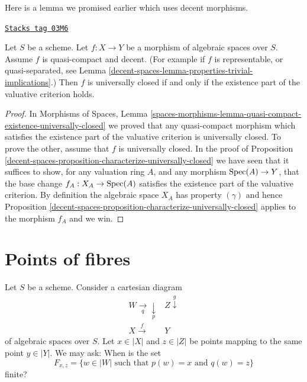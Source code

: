 Here is a lemma we promised earlier which uses decent morphisms.

\begin{lemma}
\label{decent-spaces-lemma-re-characterize-universally-closed}
\href{https://stacks.math.columbia.edu/tag/03M6}{\texttt{Stacks tag 03M6}}

Let $S$ be a scheme.
Let $f : X \to Y$ be a morphism of algebraic spaces over $S$.
Assume $f$ is quasi-compact and decent.
(For example if $f$ is representable, or quasi-separated, see
Lemma \ref{decent-spaces-lemma-properties-trivial-implications}.)
Then $f$ is universally closed if and only if the
existence part of the valuative criterion holds.
\end{lemma}

\begin{proof}
In
Morphisms of Spaces,
Lemma \ref{spaces-morphisms-lemma-quasi-compact-existence-universally-closed}
we proved that any quasi-compact morphism which satisfies the existence
part of the valuative criterion is universally closed.
To prove the other, assume that $f$ is universally closed.
In the proof of
Proposition \ref{decent-spaces-proposition-characterize-universally-closed}
we have seen that it suffices to show, for any valuation ring $A$,
and any morphism $\operatorname{Spec}(A) \to Y$, that the base change
$f_A : X_A \to \operatorname{Spec}(A)$ satisfies the existence part of the valuative
criterion. By definition the algebraic space $X_A$ has property $(\gamma)$
and hence
Proposition \ref{decent-spaces-proposition-characterize-universally-closed}
applies to the morphism $f_A$ and we win.
\end{proof}

\section{Points of fibres}
\label{decent-spaces-section-points-fibres}
Let $S$ be a scheme. Consider a cartesian diagram
\begin{equation}
\label{equation-points-fibres}
\begin{array}{cc}W \underset{q}{\longrightarrow}\underset{p}{\downarrow} & Z \overset{g}{\downarrow} \\ X \overset{f}{\longrightarrow} & Y\end{array}
\end{equation}
of algebraic spaces over $S$. Let $x \in |X|$ and $z \in |Z|$
be points mapping to the same point $y \in |Y|$. We may ask:
When is the set
\begin{equation}
\label{equation-fibre}
F_{x, z} = \{ w \in |W| \text{ such that }p(w) = x\text{ and }q(w) = z\}
\end{equation}
finite?

